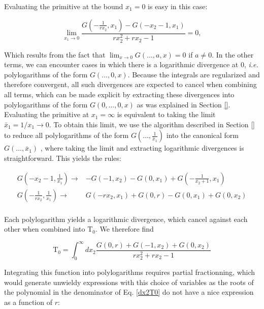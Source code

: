 Evaluating the primitive at the bound $x_1=0$ is easy in this case:

\begin{equation}
  \lim_{x_1\to 0}\frac{G\left(-\frac{1}{r x_2},x_1\right)-G\left(-x_2-1,x_1\right)}{r x_2^2+r x_2-1}=0,
\end{equation}

Which results from the fact that $\displaystyle\lim_{x\to0} G(\dots,a,x)=0$ if $a\neq0$. In the other terms, we can encounter cases in which there is a logarithmic divergence at 0, \textit{i.e.} polylogarithms of the form $G(\dots,0,x)$. Because the integrals are regularized and therefore convergent, all such divergences are expected to cancel when combining all terms, which can be made explicit by extracting these divergences into polylogarithms of the form $G(0,\dots,0,x)$ as was explained in Section \ref{}. Evaluating the primitive at $x_1=\infty$ is equivalent to taking the limit $\bar x_1=1/x_1\to 0$. To obtain this limit, we use the algorithm described in Section \ref{} to reduce all polylogarithms of the form $G\left(\dots,\frac{1}{\bar x_1}\right)$
into the canonical form $G(\dots,\bar x_1)$ , where taking the limit and extracting logarithmic divergences is straightforward. This yields the rules:


\begin{equation}
  \begin{array}{rl}
 G\left(-x_2-1,\frac{1}{x_1}\right)\to&
   -G\left(-1,x_2\right)-G\left(0,x_1\right)+G\left(-\frac{1}{x_2+1
   },x_1\right) \\
 G\left(-\frac{1}{r x_2},\frac{1}{x_1}\right)\to& G\left(-r
   x_2,x_1\right)+G(0,r)-G\left(0,x_1\right)+G\left(0,x_2\right) \\
\end{array}
\end{equation}

Each polylogarithm yields a logarithmic divergence, which cancel against each other when combined into $\text{T}_0$. We therefore find


\begin{equation}
  \text{T}_0 = \int_0^\infty dx_2 \frac{G(0,r)+G\left(-1,x_2\right)+G\left(0,x_2\right)}{r x_2^2+r
   x_2-1}
   \label{dx2T0}
\end{equation}

Integrating this function into polylogarithms requires partial fractionning, which would generate unwieldy expressions with this choice of variables as the roots of the polynomial in the denominator of Eq. \ref{dx2T0} do not have a nice expression as a function of $r$:

